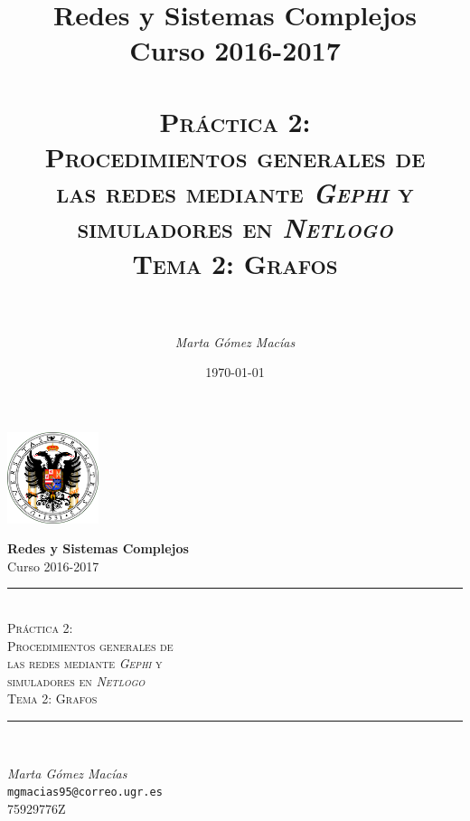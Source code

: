 \documentclass[10pt,a4paper,spanish]{article}
\title{
\normalfont \normalsize 
{\bf Redes y Sistemas Complejos} \\ Curso 2016-2017 \\ [25pt] %
\horrule{0.5pt} \\[0.4cm] %
\huge \textsc{Práctica 2: \\ Procedimientos generales de \\ las redes mediante \textit{Gephi} y \\ simuladores en \textit{Netlogo} \\ Tema 2: Grafos} \\ %
\horrule{2pt} \\[0.5cm] %
}
\author{\textit{Marta Gómez Macías}} %
\numberwithin{equation}{section} %
\numberwithin{figure}{section} %
\numberwithin{table}{section} %
\theoremstyle{plain}
\theoremstyle{definition}
\newcommand{\horrule}[1]{\rule{\linewidth}{#1}} %
\begin{document}
\renewcommand{\listtablename}{Índice de tablas}
\renewcommand{\tablename}{Tabla}

\begin{titlepage}
\begin{center}
\includegraphics[width=0.2\textwidth]{../../../ugr}

\normalfont \normalsize 
{\bf Redes y Sistemas Complejos} \\ Curso 2016-2017 \\ [25pt] %
\horrule{0.5pt} \\[0.4cm] %
{\huge \textsc{Práctica 2: \\ Procedimientos generales de \\ las redes mediante \textit{Gephi} y \\ simuladores en \textit{Netlogo} \\[0.5cm] Tema 2: Grafos}} %
\horrule{2pt} \\[0.8cm] %

{\Large \textit{Marta Gómez Macías} \\ \texttt{mgmacias95@correo.ugr.es} \\ 75929776Z \\[0.5cm]

\date{\today}} %
\end{center}
\end{titlepage}

\tableofcontents %
\end{document}
